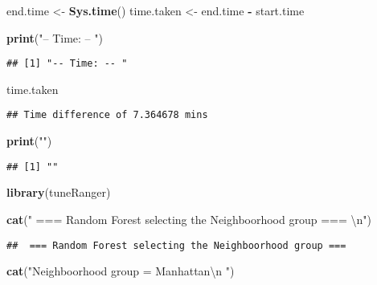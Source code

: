 \documentclass[
]{article}
\newenvironment{Shaded}{\begin{snugshade}}{\end{snugshade}}
\newcommand{\CharTok}[1]{\textcolor[rgb]{0.31,0.60,0.02}{#1}}
\newcommand{\KeywordTok}[1]{\textcolor[rgb]{0.13,0.29,0.53}{\textbf{#1}}}
\newcommand{\NormalTok}[1]{#1}
\newcommand{\OperatorTok}[1]{\textcolor[rgb]{0.81,0.36,0.00}{\textbf{#1}}}
\newcommand{\StringTok}[1]{\textcolor[rgb]{0.31,0.60,0.02}{#1}}
\begin{document}
\begin{Shaded}
\begin{Highlighting}[]
\NormalTok{end.time <-}\StringTok{ }\KeywordTok{Sys.time}\NormalTok{()}
\NormalTok{time.taken <-}\StringTok{ }\NormalTok{end.time }\OperatorTok{-}\StringTok{ }\NormalTok{start.time}

\KeywordTok{print}\NormalTok{(}\StringTok{"-- Time: -- "}\NormalTok{)}
\end{Highlighting}
\end{Shaded}

\begin{verbatim}
## [1] "-- Time: -- "
\end{verbatim}

\begin{Shaded}
\begin{Highlighting}[]
\NormalTok{time.taken}
\end{Highlighting}
\end{Shaded}

\begin{verbatim}
## Time difference of 7.364678 mins
\end{verbatim}

\begin{Shaded}
\begin{Highlighting}[]
\KeywordTok{print}\NormalTok{(}\StringTok{""}\NormalTok{) }
\end{Highlighting}
\end{Shaded}

\begin{verbatim}
## [1] ""
\end{verbatim}

\begin{Shaded}
\begin{Highlighting}[]
\KeywordTok{library}\NormalTok{(tuneRanger)}

\KeywordTok{cat}\NormalTok{(}\StringTok{" === Random Forest selecting the Neighboorhood group === }\CharTok{\textbackslash{}n}\StringTok{"}\NormalTok{)}
\end{Highlighting}
\end{Shaded}

\begin{verbatim}
##  === Random Forest selecting the Neighboorhood group ===
\end{verbatim}

\begin{Shaded}
\begin{Highlighting}[]
\KeywordTok{cat}\NormalTok{(}\StringTok{"Neighboorhood group = Manhattan}\CharTok{\textbackslash{}n}\StringTok{ "}\NormalTok{)}
\end{Highlighting}
\end{Shaded}
\end{document}
